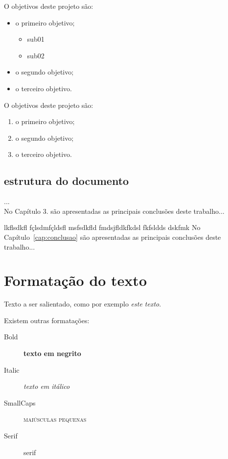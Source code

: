 \documentclass[a4wide]{report}
\begin{document}
O objetivos deste projeto são: 
\begin{itemize}
    \item o primeiro objetivo; 
        \begin{itemize}
            \item sub01 
            \item sub02
        \end{itemize}
    \item o segundo objetivo;
    \item o terceiro objetivo.
\end{itemize}
O objetivos deste projeto são: 
\begin{enumerate}
    \item o primeiro objetivo; 
    \item o segundo objetivo;
    \item o terceiro objetivo.
\end{enumerate}

\section{estrutura do documento}
... \\ 

No Capítulo 3. são apresentadas as principais conclusões deste trabalho...

lkflsdkfl fçlsdmfçldsfl msfsdkfld  fmdsjfldkfkdsl fkfsldds dskfmk No Capítulo~\ref{cap:conclusao} são apresentadas as principais conclusões deste trabalho...

\chapter{Formatação do texto}
Texto a ser salientado, como por exemplo \emph{este texto}.

Existem outras formatações:
\begin{description} 
\item[Bold]      \textbf{texto em negrito}
\item[Italic]    \textit{texto em itálico}
\item[SmallCaps] \textsc{maiúsculas pequenas}
\item[Serif]     \textsf{serif}
\end{description}
\end{document}
